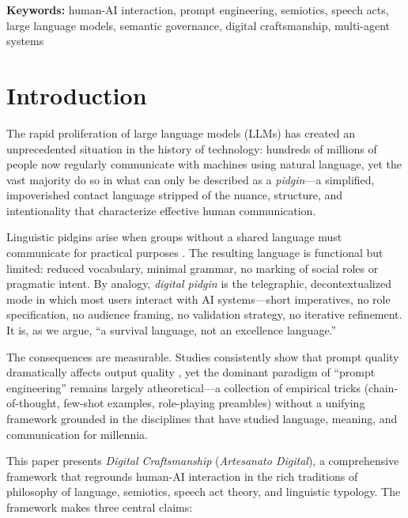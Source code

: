 \documentclass[11pt,a4paper]{article}
\begin{document}
\textbf{Keywords:} human-AI interaction, prompt engineering, semiotics, speech acts, large language models, semantic governance, digital craftsmanship, multi-agent systems

\section{Introduction}
\label{sec:introduction}

The rapid proliferation of large language models (LLMs) has created an unprecedented situation in the history of technology: hundreds of millions of people now regularly communicate with machines using natural language, yet the vast majority do so in what can only be described as a \emph{pidgin}---a simplified, impoverished contact language stripped of the nuance, structure, and intentionality that characterize effective human communication.

Linguistic pidgins arise when groups without a shared language must communicate for practical purposes \citep{muhlhausler1997pidgin}. The resulting language is functional but limited: reduced vocabulary, minimal grammar, no marking of social roles or pragmatic intent. By analogy, \emph{digital pidgin} is the telegraphic, decontextualized mode in which most users interact with AI systems---short imperatives, no role specification, no audience framing, no validation strategy, no iterative refinement. It is, as we argue, ``a survival language, not an excellence language.''

The consequences are measurable. Studies consistently show that prompt quality dramatically affects output quality \citep{wei2022chain, zhou2023large}, yet the dominant paradigm of ``prompt engineering'' remains largely atheoretical---a collection of empirical tricks (chain-of-thought, few-shot examples, role-playing preambles) without a unifying framework grounded in the disciplines that have studied language, meaning, and communication for millennia.

This paper presents \emph{Digital Craftsmanship} (\emph{Artesanato Digital}), a comprehensive framework that regrounds human-AI interaction in the rich traditions of philosophy of language, semiotics, speech act theory, and linguistic typology. The framework makes three central claims:
\end{document}
